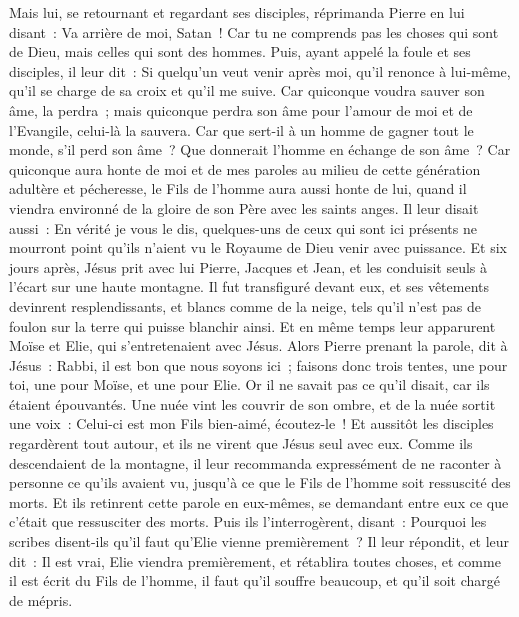 \begin{multicols}{2}
Mais lui, se retournant et regardant ses disciples, réprimanda Pierre en lui disant~: Va arrière de moi, Satan~! Car tu ne comprends pas les choses qui sont de Dieu, mais celles qui sont des hommes.
Puis, ayant appelé la foule et ses disciples, il leur dit~: Si quelqu'un veut venir après moi, qu'il renonce à lui-même, qu'il se charge de sa croix et qu'il me suive.
Car quiconque voudra sauver son âme, la perdra~; mais quiconque perdra son âme pour l'amour de moi et de l'Evangile, celui-là la sauvera.
Car que sert-il à un homme de gagner tout le monde, s'il perd son âme~?
Que donnerait l'homme en échange de son âme~?
Car quiconque aura honte de moi et de mes paroles au milieu de cette génération adultère et pécheresse, le Fils de l'homme aura aussi honte de lui, quand il viendra environné de la gloire de son Père avec les saints anges.
\VerseOne{}Il leur disait aussi~: En vérité je vous le dis, quelques-uns de ceux qui sont ici présents ne mourront point qu'ils n'aient vu le Royaume de Dieu venir avec puissance.
Et six jours après, Jésus prit avec lui Pierre, Jacques et Jean, et les conduisit seuls à l'écart sur une haute montagne. Il fut transfiguré devant eux,
et ses vêtements devinrent resplendissants, et blancs comme de la neige, tels qu'il n'est pas de foulon sur la terre qui puisse blanchir ainsi.
Et en même temps leur apparurent Moïse et Elie, qui s'entretenaient avec Jésus.
Alors Pierre prenant la parole, dit à Jésus~: Rabbi, il est bon que nous soyons ici~; faisons donc trois tentes, une pour toi, une pour Moïse, et une pour Elie.
Or il ne savait pas ce qu'il disait, car ils étaient épouvantés.
Une nuée vint les couvrir de son ombre, et de la nuée sortit une voix~: Celui-ci est mon Fils bien-aimé, écoutez-le~!
Et aussitôt les disciples regardèrent tout autour, et ils ne virent que Jésus seul avec eux.
Comme ils descendaient de la montagne, il leur recommanda expressément de ne raconter à personne ce qu'ils avaient vu, jusqu'à ce que le Fils de l'homme soit ressuscité des morts.
Et ils retinrent cette parole en eux-mêmes, se demandant entre eux ce que c'était que ressusciter des morts.
Puis ils l'interrogèrent, disant~: Pourquoi les scribes disent-ils qu'il faut qu'Elie vienne premièrement~?
Il leur répondit, et leur dit~: Il est vrai, Elie viendra premièrement, et rétablira toutes choses, et comme il est écrit du Fils de l'homme, il faut qu'il souffre beaucoup, et qu'il soit chargé de mépris.

\end{multicols}

